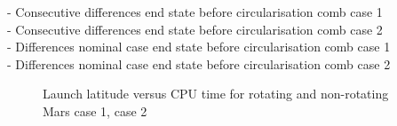- Consecutive differences end state before circularisation comb case 1 \\
- Consecutive differences end state before circularisation comb case 2 \\
- Differences nominal case end state before circularisation comb case 1 \\
- Differences nominal case end state before circularisation comb case 2 \\

\begin{figure}[H]
\centering
{} 
\caption{Launch latitude versus CPU time for rotating and non-rotating Mars \protect{} case 1,  \protect{} case 2 } 
\label{fig:launchLatitudeVsCPUcase1combined} 
\end{figure} 



